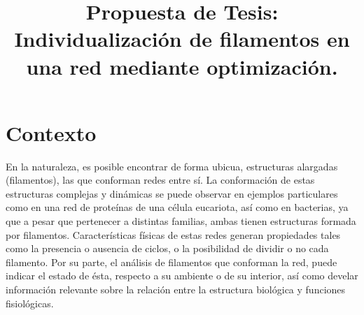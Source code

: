 \documentclass{article}
\title{Propuesta de Tesis: Individualizaci\'on de filamentos en una red mediante optimizaci\'on.}
\date{}
\begin{document}
\maketitle

\section{Contexto}
\label{contexto}

En la naturaleza, es posible encontrar de forma ubicua, estructuras alargadas (filamentos), las que conforman redes entre sí. La conformación de estas estructuras complejas y din\'amicas se puede observar en ejemplos particulares como en una red de prote\'inas de una c\'elula eucariota, as\'i como en bacterias, ya que a pesar que pertenecer a distintas familias, ambas tienen estructuras formada por filamentos. 
Caracter\'isticas f\'isicas de estas redes generan propiedades tales como la presencia o ausencia de ciclos, o la posibilidad de dividir o no cada filamento. Por su parte, el análisis de filamentos que conforman la red, puede indicar el estado de \'esta, respecto a su ambiente o de su interior, as\'i como develar informaci\'on relevante sobre la relaci\'on entre la estructura biol\'ogica y funciones fisiol\'ogicas.  
  
\end{document}
